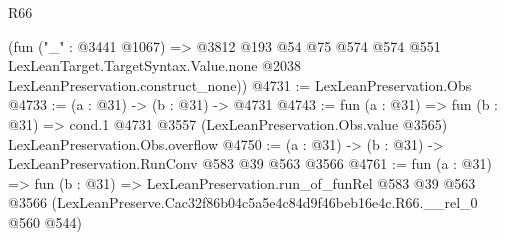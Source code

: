 \begin{lexlean}{R66}
\begin{coremodule}
      (fun ("_" : @3441 @1067) =>
      @3812
        @193
        @54
        @75
        @574
        @574
        @551
        LexLeanTarget.TargetSyntax.Value.none
        @2038
        LexLeanPreservation.construct_none))
@4731 := LexLeanPreservation.Obs
@4733 := (a : @31) -> (b : @31) -> @4731
@4743 := fun (a : @31) =>
  fun (b : @31) =>
  cond.{1} @4731 @3557 (LexLeanPreservation.Obs.value @3565) LexLeanPreservation.Obs.overflow
@4750 := (a : @31) -> (b : @31) -> LexLeanPreservation.RunConv @583 @39 @563 @3566
@4761 := fun (a : @31) =>
  fun (b : @31) =>
  LexLeanPreservation.run_of_funRel
    @583
    @39
    @563
    @3566
    (LexLeanPreserve.Cac32f86b04c5a5e4c84d9f46beb16e4c.R66.__rel_0 @560 @544)
\end{coremodule}
\end{lexlean}
